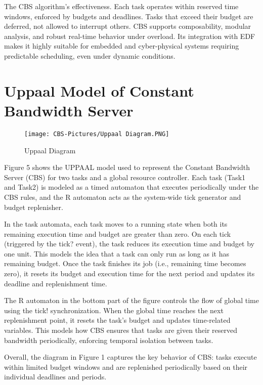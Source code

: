 \documentclass[conference]{IEEEtran}
\begin{document}
The CBS algorithm's effectiveness. Each task operates within reserved time windows, enforced by budgets and deadlines. Tasks that exceed their budget are deferred, not allowed to interrupt others. CBS supports composability, modular analysis, and robust real-time behavior under overload. Its integration with EDF makes it highly suitable for embedded and cyber-physical systems requiring predictable scheduling, even under dynamic conditions.

\section{\textbf{Uppaal Model of Constant Bandwidth Server}}

\vspace{0.9cm}
\begin{figure}[h]
    \centering
    \texttt{[image: CBS-Pictures/Uppaal Diagram.PNG]}
    \caption{Uppaal Diagram}
    \label{fig:enter-label}
\end{figure}

\noindent
Figure 5 shows the UPPAAL model used to represent the Constant Bandwidth Server (CBS) for two tasks and a global resource controller. Each task (Task1 and Task2) is modeled as a timed automaton that executes periodically under the CBS rules, and the R automaton acts as the system-wide tick generator and budget replenisher.

In the task automata, each task moves to a running state when both its remaining execution time and budget are greater than zero. On each tick (triggered by the tick? event), the task reduces its execution time and budget by one unit. This models the idea that a task can only run as long as it has remaining budget. Once the task finishes its job (i.e., remaining time becomes zero), it resets its budget and execution time for the next period and updates its deadline and replenishment time.

The R automaton in the bottom part of the figure controls the flow of global time using the tick! synchronization. When the global time reaches the next replenishment point, it resets the task's budget and updates time-related variables. This models how CBS ensures that tasks are given their reserved bandwidth periodically, enforcing temporal isolation between tasks.

Overall, the diagram in Figure 1 captures the key behavior of CBS: tasks execute within limited budget windows and are replenished periodically based on their individual deadlines and periods.
\end{document}
